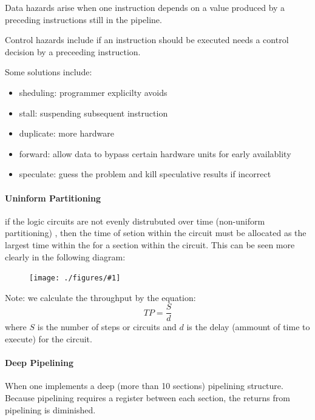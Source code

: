 \documentclass[12pt]{book}
\newcommand{\incimg}[2]{%
       \begin{figure}[h]
               \centering
               \texttt{[image: ./figures/\#1]}
       \end{figure}
}
\begin{document}
 Data hazards arise when one instruction depends on a value produced by a preceding instructions
 still in the pipeline.

 Control hazards include if an instruction should be executed needs a control decision by
 a preceeding instruction.

 Some solutions include:
 \begin{itemize}
         \item sheduling: programmer explicilty avoids 
         \item stall: suspending subsequent instruction
         \item duplicate: more hardware
         \item forward: allow data to bypass certain hardware units for early availablity
         \item speculate: guess the problem and kill speculative results if incorrect
 \end{itemize}
 \pagebreak

 \paragraph{Uninform Partitioning}
if the logic circuits are not evenly distrubuted over time (non-uniform partitioning)
, then the time of setion within the circuit must be allocated as the largest 
time within the for a section within the circuit. This can be seen
more clearly in the following diagram:
\incimg{limits}{0.5}
 
Note: we calculate the throughput by the equation:
\[TP = \frac{S}{d}\]
where $S$ is the number of steps or circuits and $d$ is the delay (ammount of time to execute)
 for the circuit.

 \paragraph{Deep Pipelining}
 When one implements a deep (more than 10 sections)
 pipelining structure. Because pipelining requires a register between each section, the returns
 from pipelining is diminished.
\end{document}
